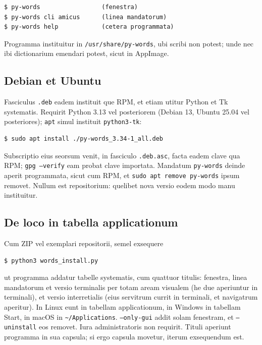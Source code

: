 \documentclass[12pt,
              article,
              oneside
              ]{memoir}
\begin{document}
\begin{verbatim}
$ py-words                 (fenestra)
$ py-words cli amicus      (linea mandatorum)
$ py-words help            (cetera programmata)
\end{verbatim}

\noindent{}%
Programma instituitur in \texttt{/usr/share/py-words}, ubi scribi non
potest; unde nec ibi dictionarium emendari potest, sicut in AppImage.

\subsection{Debian et Ubuntu}

%
Fasciculus \texttt{.deb} eadem instituit que RPM, et etiam utitur Python
et Tk systematis. Requirit Python 3.13 vel posteriorem (Debian 13, Ubuntu
25.04 vel posteriores); \texttt{apt} simul instituit \texttt{python3-tk}:

\begin{verbatim}
$ sudo apt install ./py-words_3.34-1_all.deb
\end{verbatim}

\noindent
Subscriptio eius seorsum venit, in fasciculo \texttt{.deb.asc}, facta
eadem clave qua RPM; \texttt{gpg --verify} eam probat clave importata.
Mandatum \texttt{py-words} deinde aperit programmata, sicut cum RPM, et
\texttt{sudo apt remove py-words} ipsum removet. Nullum est repositorium:
quelibet nova versio eodem modo manu instituitur.

\subsection{De loco in tabella applicationum}

%
Cum ZIP vel exemplari repositorii, semel exsequere

\begin{verbatim}
$ python3 words_install.py
\end{verbatim}

\noindent
ut programma addatur tabelle systematis, cum quattuor titulis: fenestra,
linea mandatorum et versio terminalis per totam aream visualem (he due
aperiuntur in terminali), et versio interretialis (eius servitrum currit
in terminali, et navigatrum aperitur). In Linux eunt in tabellam
applicationum, in Windows in tabellam Start, in macOS in
\texttt{\textasciitilde/Applications}. \texttt{--only-gui} addit solam
fenestram, et \texttt{--uninstall} eos removet. Iura administratoris non
requirit. Tituli aperiunt programma in sua capsula; si ergo capsula
movetur, iterum exsequendum est.
\end{document}
